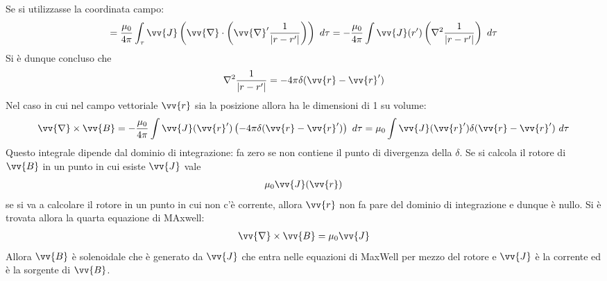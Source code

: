 \documentclass[a4paper, oneside]{article}
\begin{document}
Se si utilizzasse la coordinata campo:
\begin{gather*}
    = \frac{\mu_0}{4\pi} \int_{\tau} \vv{J}\left(\vv{\nabla} \cdot \left(\vv{\nabla}' \frac{1}{\left| r - r' \right| } \right) \right)  \ d\tau = - \frac{\mu_0}{4\pi} \int \vv{J}(r') \left(\nabla^{2} \frac{1}{\left| r - r' \right| }\right) \ d\tau  
\end{gather*}
Si è dunque concluso che 
\begin{gather*}
    \nabla^{2} \frac{1}{\left| r - r' \right| } = -4\pi \delta (\vv{r} - \vv{r}'  )
\end{gather*}
Nel caso in cui nel campo vettoriale $\vv{r}$ sia la posizione allora ha le dimensioni 
di 1 su volume:
\begin{gather*}
    \vv{\nabla} \times \vv{B} = - \frac{\mu_0}{4\pi} \int \vv{J}(\vv{r}' ) \left(-4\pi \delta (\vv{r} - \vv{r}'  )\right) \ d\tau = \mu_0 \int \vv{J}(\vv{r}' ) \delta (\vv{r} - \vv{r}'  ) \ d\tau      
\end{gather*}
Questo integrale dipende dal dominio di integrazione: fa zero se non contiene il punto di
divergenza della $\delta$. Se si calcola il rotore di $\vv{B}$ in un punto in 
cui esiste $\vv{J}$ vale
\begin{gather*}
    \mu_0 \vv{J}(\vv{r} ) 
\end{gather*}  
se si va a calcolare il rotore in un punto in cui non c'è corrente, allora
$\vv{r}$ non fa pare del dominio di integrazione e dunque è nullo. Si è 
trovata allora la quarta equazione di MAxwell: 
\begin{align}
    \vv{\nabla} \times \vv{B} = \mu_0 \vv{J}   
\end{align} 
Allora $\vv{B}$ è solenoidale che è generato da $\vv{J}$ che entra nelle equazioni 
di MaxWell per mezzo del rotore e $\vv{J}$ è la corrente ed è la sorgente di $\vv{B}$.
\end{document}

